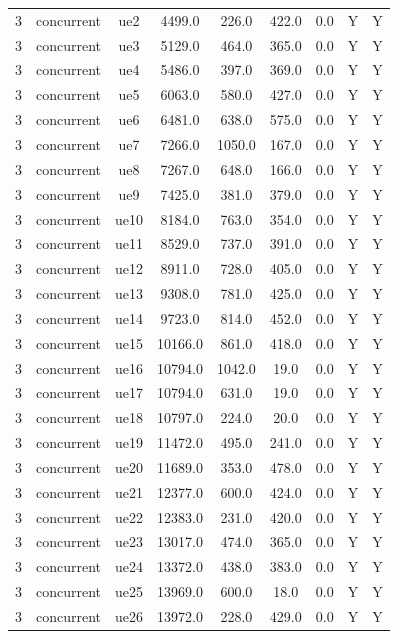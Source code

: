 \begin{table}[ht]
\begin{tabular}{|c|c|c|c|c|c|c|c|c|}
3 & concurrent & ue2 & 4499.0 & 226.0 & 422.0 & 0.0 & Y & Y \\
3 & concurrent & ue3 & 5129.0 & 464.0 & 365.0 & 0.0 & Y & Y \\
3 & concurrent & ue4 & 5486.0 & 397.0 & 369.0 & 0.0 & Y & Y \\
3 & concurrent & ue5 & 6063.0 & 580.0 & 427.0 & 0.0 & Y & Y \\
3 & concurrent & ue6 & 6481.0 & 638.0 & 575.0 & 0.0 & Y & Y \\
3 & concurrent & ue7 & 7266.0 & 1050.0 & 167.0 & 0.0 & Y & Y \\
3 & concurrent & ue8 & 7267.0 & 648.0 & 166.0 & 0.0 & Y & Y \\
3 & concurrent & ue9 & 7425.0 & 381.0 & 379.0 & 0.0 & Y & Y \\
3 & concurrent & ue10 & 8184.0 & 763.0 & 354.0 & 0.0 & Y & Y \\
3 & concurrent & ue11 & 8529.0 & 737.0 & 391.0 & 0.0 & Y & Y \\
3 & concurrent & ue12 & 8911.0 & 728.0 & 405.0 & 0.0 & Y & Y \\
3 & concurrent & ue13 & 9308.0 & 781.0 & 425.0 & 0.0 & Y & Y \\
3 & concurrent & ue14 & 9723.0 & 814.0 & 452.0 & 0.0 & Y & Y \\
3 & concurrent & ue15 & 10166.0 & 861.0 & 418.0 & 0.0 & Y & Y \\
3 & concurrent & ue16 & 10794.0 & 1042.0 & 19.0 & 0.0 & Y & Y \\
3 & concurrent & ue17 & 10794.0 & 631.0 & 19.0 & 0.0 & Y & Y \\
3 & concurrent & ue18 & 10797.0 & 224.0 & 20.0 & 0.0 & Y & Y \\
3 & concurrent & ue19 & 11472.0 & 495.0 & 241.0 & 0.0 & Y & Y \\
3 & concurrent & ue20 & 11689.0 & 353.0 & 478.0 & 0.0 & Y & Y \\
3 & concurrent & ue21 & 12377.0 & 600.0 & 424.0 & 0.0 & Y & Y \\
3 & concurrent & ue22 & 12383.0 & 231.0 & 420.0 & 0.0 & Y & Y \\
3 & concurrent & ue23 & 13017.0 & 474.0 & 365.0 & 0.0 & Y & Y \\
3 & concurrent & ue24 & 13372.0 & 438.0 & 383.0 & 0.0 & Y & Y \\
3 & concurrent & ue25 & 13969.0 & 600.0 & 18.0 & 0.0 & Y & Y \\
3 & concurrent & ue26 & 13972.0 & 228.0 & 429.0 & 0.0 & Y & Y \\

\end{tabular}
\end{table}
